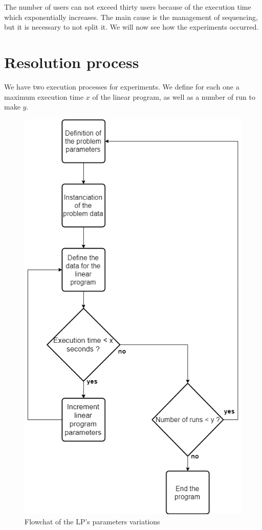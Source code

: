 \documentclass[12pt, a4paper,twoside]{memoir}
\newcommand{\newpar}{\vskip 0.2in \noindent}
\begin{document}
	The number of users can not exceed thirty users because of the execution time which exponentially increases. The main cause is the management of sequencing, but it is necessary to not split it.
	\newpar
	We will now see how the experiments occurred.
	
	\section{Resolution process}
	
	We have two execution processes for experiments. We define for each one a maximum execution time $x$ of the linear program, as well as a number of run to make $y$.
	
	\begin{figure}[H]
		\centering
		\begin{flushleft}
			\includegraphics[scale=0.6]{img/i_flowchartlpvariation.png}
		\end{flushleft}
		\caption{Flowchat of the LP's parameters variations}
		\label{fig:Flowchat of the LP variations}
	\end{figure}
	
\end{document}
